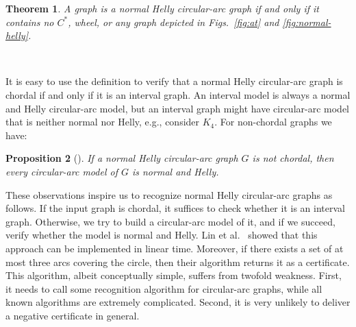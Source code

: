 \documentclass[10pt]{article}
\newtheorem{theorem}{Theorem}[section]
\newtheorem{proposition}[theorem]{Proposition}
\newcommand{\nhcag}{normal Helly circular-arc graph}
\begin{document}
\begin{theorem}\label{thm:characterization}
A graph is a normal Helly circular-arc graph if and only if it
contains no $C^*$, wheel, or any graph depicted in Figs.~\ref{fig:at}
and \ref{fig:normal-helly}.
\end{theorem}
\begin{figure*}[t]
  \centering
  $\quad$
  $\quad$
  $\quad$  
  $\quad$  
  $\quad$
  \caption{Non-chordal and finite minimal forbidden induced graphs.}
  \label{fig:normal-helly}
\end{figure*}

It is easy to use the definition to verify that a normal Helly
circular-arc graph is chordal if and only if it is an interval graph.
An interval model is always a normal and Helly circular-arc model, but
an interval graph might have circular-arc model that is neither normal
nor Helly, e.g., consider $K_4$.  For non-chordal graphs we have:
\begin{proposition}[\cite{mckee-03-restricted-cag,lin-13-nhcag-and-subclasses}]
  \label{thm:always-noraml-and-helly}
  If a normal Helly circular-arc graph $G$ is not chordal, then every
  circular-arc model of $G$ is normal and Helly.
\end{proposition}
These observations inspire us to recognize \nhcag s as follows.  If
the input graph is chordal, it suffices to check whether it is an
interval graph.  Otherwise, we try to build a circular-arc model of
it, and if we succeed, verify whether the model is normal and Helly.  Lin
et al.~\cite{lin-13-nhcag-and-subclasses} showed that this approach
can be implemented in linear time.  Moreover, if there exists a set of
at most three arcs covering the circle, then their algorithm returns
it as a certificate.
This algorithm, albeit conceptually simple, suffers from twofold
weakness.  First, it needs to call some recognition algorithm for
circular-arc graphs, while all known algorithms are extremely
complicated.  Second, it is very unlikely to deliver a negative
certificate in general.  
\end{document}
